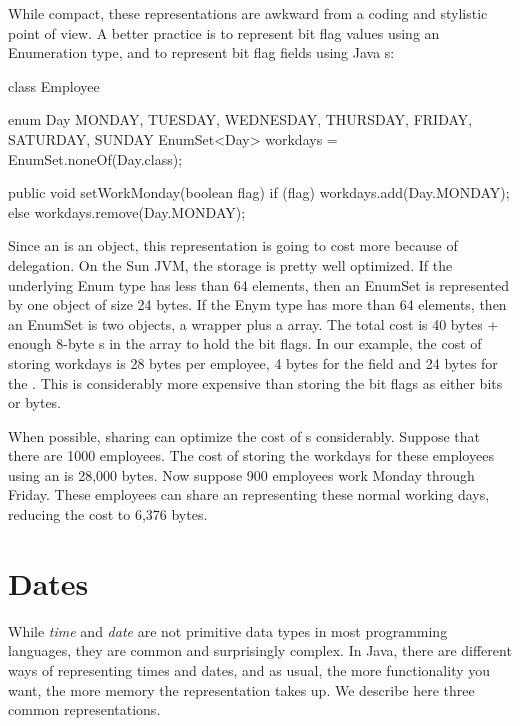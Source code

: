 While compact, these representations are awkward from a coding and
stylistic point of view. A better practice is to represent bit flag values
using an Enumeration type, and to represent bit flag fields using Java
s:
\begin{shortlisting}

    class Employee {
 
		enum Day {MONDAY, TUESDAY, WEDNESDAY, THURSDAY, FRIDAY, SATURDAY, SUNDAY}
    	EnumSet<Day> workdays = EnumSet.noneOf(Day.class);
    
   	 	public void setWorkMonday(boolean flag) {
			if (flag) {
				workdays.add(Day.MONDAY);
			} else {
				workdays.remove(Day.MONDAY);
			}
		}
	}
    
    
\end{shortlisting}

Since an  is an object, this representation is going to
cost more because of delegation. On the Sun JVM, the storage is pretty
well optimized. If the underlying Enum type has less than 64 elements, then an
EnumSet is represented by one object of size 24 bytes. If the Enym type has more
than 64 elements, then an EnumSet is two objects, a wrapper plus a
 array. The total cost is 40 bytes + enough 8-byte s
in the array to hold the bit flags. In our example, the cost of storing workdays is 28 bytes per employee, 4 bytes
for the field and 24 bytes for the . This is considerably
more expensive than storing the bit flags as either bits or bytes. 

When possible, sharing can optimize the cost of 
 s considerably. Suppose
that there are 1000 employees. The cost of storing the workdays for these
employees using an  is 28,000 bytes. 
Now suppose 900 employees work Monday
through Friday. These employees can share an  representing
these normal working days, reducing the cost to 6,376 bytes.


\section{Dates}

While \textit{time} and \textit{date} are not primitive data types in most
programming languages, they are common and surprisingly complex. 
In Java, there are different ways of representing times and dates, and as
usual, the more functionality you want, the more memory the representation takes
up. We describe here three common representations.

